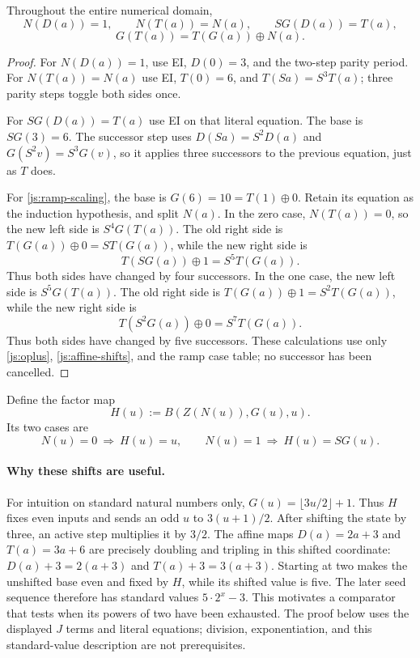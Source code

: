 \begin{lemma}\label{js:affine-lemmas}
Throughout the entire numerical domain,
\[
 N(D(a))=1,\qquad N(T(a))=N(a),\qquad
 S G(D(a))=T(a),
 \tag{Affine parity and ramp}\label{js:affine-parity}
\]
\[
 G(T(a))=T(G(a))\oplus N(a).
 \tag{Ramp scaling}\label{js:ramp-scaling}
\]
\end{lemma}
\begin{proof}
For $N(D(a))=1$, use EI, $D(0)=3$, and the two-step parity
period.  For $N(T(a))=N(a)$ use EI, $T(0)=6$, and
$T(Sa)=S^3T(a)$; three parity steps toggle both sides once.

For $S G(D(a))=T(a)$ use EI on that literal equation.  The base
is $S G(3)=6$.  The successor step uses
$D(Sa)=S^2D(a)$ and $G(S^2v)=S^3G(v)$, so it applies three
successors to the previous equation, just as $T$ does.

For \eqref{js:ramp-scaling}, the base is
$G(6)=10=T(1)\oplus0$.  Retain its equation as the induction
hypothesis, and split $N(a)$.  In the zero case, $N(T(a))=0$,
so the new left side is $S^4G(T(a))$.  The old right side is
$T(G(a))\oplus0=S T(G(a))$, while the new right side is
\[
 T(SG(a))\oplus1=S^5T(G(a)).
\]
Thus both sides have changed by four successors.  In the one case,
the new left side is $S^5G(T(a))$.  The old right side is
$T(G(a))\oplus1=S^2T(G(a))$, while the new right side is
\[
 T(S^2G(a))\oplus0=S^7T(G(a)).
\]
Thus both sides have changed by five successors.  These calculations
use only \eqref{js:oplus}, \eqref{js:affine-shifts}, and the ramp
case table; no successor has been cancelled.
\end{proof}

Define the factor map
\[
 H(u):=B(Z(N(u)),G(u),u).
\]
Its two cases are
\[
 N(u)=0\ \Longrightarrow\ H(u)=u,\qquad
 N(u)=1\ \Longrightarrow\ H(u)=S G(u).
\]

\paragraph{Why these shifts are useful.}
For intuition on standard natural numbers only, $G(u)=\lfloor3u/2\rfloor+1$.
Thus $H$ fixes even inputs and sends an odd $u$ to $3(u+1)/2$.
After shifting the state by three, an active step multiplies it by $3/2$.
The affine maps $D(a)=2a+3$ and $T(a)=3a+6$ are precisely doubling
and tripling in this shifted coordinate: $D(a)+3=2(a+3)$ and
$T(a)+3=3(a+3)$. Starting at two makes the unshifted base even and
fixed by $H$, while its shifted value is five. The later seed sequence
therefore has standard values $5\cdot2^x-3$. This motivates a comparator
that tests when its powers of two have been exhausted. The proof below
uses the displayed $J$ terms and literal equations; division, exponentiation,
and this standard-value description are not prerequisites.

